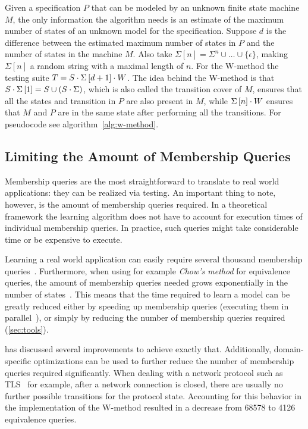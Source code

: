 Given a specification $P$ that can be modeled by an unknown finite state machine $M$,
the only information the algorithm needs is an estimate of the maximum number of
states of an unknown model for the specification.
Suppose $d$ is the difference between the estimated maximum number of states in $P$
and the number of states in the machine $M$.
Also take $\Sigma \left[ n \right] = \Sigma^{n} \cup \dots \cup \lbrace \epsilon \rbrace$,
making $\Sigma\left[ n \right]$ a random string with a maximal length of $n$.
For the W-method the testing suite $T = S \cdot \Sigma\left[ d + 1 \right]  \cdot W$.
The idea behind the W-method is that $S \cdot \Sigma\left[ 1 \right]  = S \cup (S
\cdot \Sigma)$, which is also called the transition cover of $M$, ensures that all the
states and transition in $P$ are also present in $M$, while
$\Sigma\left[ n \right] \cdot W$ ensures that $M$ and $P$ are in the same state after
performing all the transitions. For pseudocode see algorithm~\ref{alg:w-method}.

\subsection{Limiting the Amount of Membership Queries}
Membership queries are the most straightforward to translate to real world
applications: they can be realized via testing.  An important thing to note,
however, is the amount of membership queries required.  In a theoretical
framework the learning algorithm does not have to account for execution times of
individual membership queries. In practice, such queries might take
considerable time or be expensive to execute.

Learning a real world application can easily require several thousand membership
queries~\cite[p. 100]{Tomte2014}. Furthermore, when using for example
\textit{Chow's method} for equivalence queries, the amount of membership queries
needed grows exponentially in the number of states~\cite{Chow1978}.  This means
that the time required to learn a model can be greatly reduced either by
speeding up membership queries (executing them in parallel~\cite{Howar2012}), or
simply by reducing the number of membership queries required (\cref{sec:tools}).

 has discussed several improvements to achieve exactly
that. Additionally, domain-specific optimizations can be used to further reduce
the number of membership queries required significantly.  When dealing with a
network protocol such as TLS~\cite{deRuiter2015} 
for example, after a network connection is closed, there are usually no further
possible transitions for the protocol state.  Accounting for this behavior in
the implementation of the W-method resulted in a decrease from 68578 to 4126
equivalence queries.

